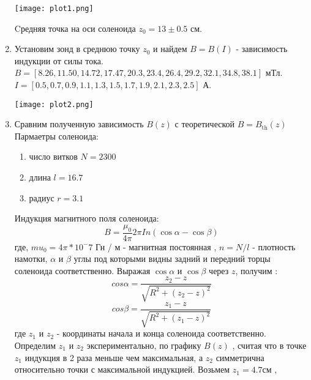 \documentclass[10pt]{article}
\begin{document}
\begin{enumerate}
        \begin{center}
        \texttt{[image: plot1.png]}
        \end{center}
        Cредняя точка на оси соленоида $z_0 = 13 \pm 0.5$ см.
    \item Установим зонд в среднюю точку $z_0$ и найдем $B = B(I)$ - зависимость индукции от силы тока. \\
            $B = [8.26,11.50,14.72,17.47,20.3,23.4,26.4,29.2,32.1,34.8,38.1]$ мТл. \\
            $I = [0.5, 0.7, 0.9,  1.1,  1.3,  1.5 , 1.7,  1.9 , 2.1 , 2.3 , 2.5]$ А.
            \begin{center}
            \texttt{[image: plot2.png]}
            \end{center}
    \item Сравним полученную зависимость $B(z)$ с теоретической $B = B_{\text{th}}(z)$ \\ 
            Пармаетры соленоида: 
            \begin{enumerate}
                \item число витков $N = 2300$
                \item длина $l = 16.7$
                \item радиус $r = 3.1$
            \end{enumerate}
            Индукция магнитного поля соленоида:
            \begin{equation}
                B = \frac{\mu_0}{4 \pi} 2 \pi In(\cos{\alpha} - \cos{\beta})
            \end{equation} где, $mu_0 = 4 \pi * 10^-7$ Гн / м - магнитная постоянная , $n = N/l$ - плотность намотки, $\alpha$ и $\beta$ углы под которыми видны задний и передний торцы соленоида соответственно. Выражая $\cos{\alpha}$ и $\cos{\beta}$ через $z$, получим :
            \begin{equation}
                cos{\alpha} = \frac{z_2 - z }{ \sqrt{R^2 + (z_2-z)^2}} 
            \end{equation}
            \begin{equation}
                cos{\beta} = \frac{z_1-z}{\sqrt{R^2 + (z_1-z)^2}}  
            \end{equation}
            где $z_1$ и $z_2$ - координаты начала и конца соленоида соответственно. \\
            Определим $z_1$ и $z_2$ экспериментально, по графику $B(z)$ , считая что в точке $z_1$ индукция в 2 раза меньше чем максимальная, а $z_2$ симметрична относительно точки с максимальной индукцией. Возьмем $z_1 = 4.7$см ,

\end{enumerate}
\end{document}
